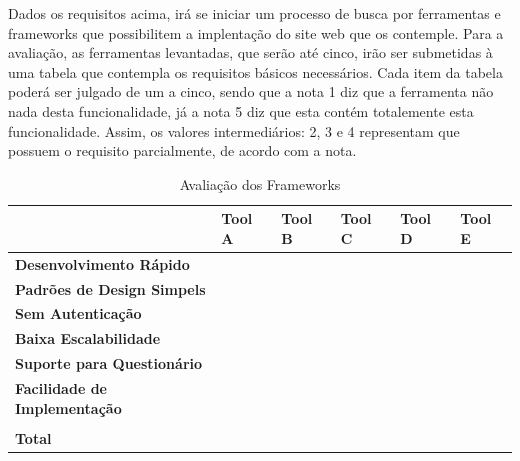 Dados os requisitos acima, irá se iniciar um processo de busca por ferramentas e frameworks que possibilitem a implentação do site
web que os contemple. Para a avaliação, as ferramentas levantadas, que serão até cinco, irão ser submetidas à uma tabela que contempla
os requisitos básicos necessários. Cada item da tabela poderá ser julgado de um a cinco, sendo que a nota 1 diz que a ferramenta não nada
desta funcionalidade, já a nota 5 diz que esta contém totalemente esta funcionalidade. Assim, os valores intermediários: 2, 3 e 4 representam
que possuem o requisito parcialmente, de acordo com a nota.

\begin{table}[]
    \centering
    \begin{tabular}{@{}llllll@{}}
        \toprule
        \textbf{}                                                  & \textbf{Tool A}       & \textbf{Tool B}       & \textbf{Tool C}       & \textbf{Tool D}       & \textbf{Tool E}       \\ \midrule
        \multicolumn{1}{|l|}{\textbf{Desenvolvimento Rápido}}      & \multicolumn{1}{l|}{} & \multicolumn{1}{l|}{} & \multicolumn{1}{l|}{} & \multicolumn{1}{l|}{} & \multicolumn{1}{l|}{} \\ \midrule
        \multicolumn{1}{|l|}{\textbf{Padrões de Design Simpels}}   & \multicolumn{1}{l|}{} & \multicolumn{1}{l|}{} & \multicolumn{1}{l|}{} & \multicolumn{1}{l|}{} & \multicolumn{1}{l|}{} \\ \midrule
        \multicolumn{1}{|l|}{\textbf{Sem Autenticação}}            & \multicolumn{1}{l|}{} & \multicolumn{1}{l|}{} & \multicolumn{1}{l|}{} & \multicolumn{1}{l|}{} & \multicolumn{1}{l|}{} \\ \midrule
        \multicolumn{1}{|l|}{\textbf{Baixa Escalabilidade}}        & \multicolumn{1}{l|}{} & \multicolumn{1}{l|}{} & \multicolumn{1}{l|}{} & \multicolumn{1}{l|}{} & \multicolumn{1}{l|}{} \\ \midrule
        \multicolumn{1}{|l|}{\textbf{Suporte para Questionário}}   & \multicolumn{1}{l|}{} & \multicolumn{1}{l|}{} & \multicolumn{1}{l|}{} & \multicolumn{1}{l|}{} & \multicolumn{1}{l|}{} \\ \midrule
        \multicolumn{1}{|l|}{\textbf{Facilidade de Implementação}} & \multicolumn{1}{l|}{} & \multicolumn{1}{l|}{} & \multicolumn{1}{l|}{} & \multicolumn{1}{l|}{} & \multicolumn{1}{l|}{} \\ \midrule
                                                                   &                       &                       &                       &                       &                       \\ \midrule
                                                                   \multicolumn{1}{|l|}{\textbf{Total}}                       & \multicolumn{1}{l|}{} & \multicolumn{1}{l|}{} & \multicolumn{1}{l|}{} & \multicolumn{1}{l|}{} & \multicolumn{1}{l|}{} \\ \bottomrule
    \end{tabular}
    \caption{Avaliação dos Frameworks}
    \label{my-label}
\end{table}

